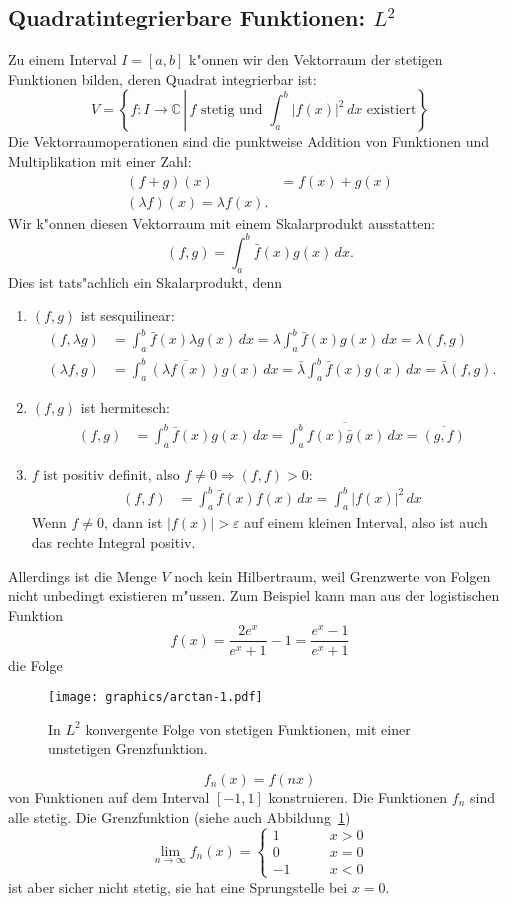 \subsection{Quadratintegrierbare Funktionen: $L^2$}
Zu einem Interval $I=[a,b]$ k"onnen wir den Vektorraum der stetigen Funktionen
bilden, deren Quadrat integrierbar ist:
\[
V=\left\{
f:I\to\mathbb C\,\left|\,
\text{$f$ stetig und $\displaystyle \int_a^b|f(x)|^2\,dx$ existiert}
\right. \right\}
\]
Die Vektorraumoperationen sind die punktweise Addition von Funktionen
und Multiplikation mit einer Zahl:
\begin{align*}
(f+g)(x)&=f(x)+g(x)\\
(\lambda f)(x)=\lambda f(x).
\end{align*}
Wir k"onnen diesen Vektorraum mit einem Skalarprodukt ausstatten:
\[
(f,g)=\int_a^b \bar f(x)g(x)\,dx.
\]
Dies ist tats"achlich ein Skalarprodukt, denn
\begin{enumerate}
\item $(f,g)$ ist sesquilinear:
\begin{align*}
(f,\lambda g)&=\int_a^b\bar f(x)\lambda g(x)\,dx
=\lambda\int_a^b\bar f(x)g(x)\,dx = \lambda(f,g)
\\
(\lambda f,g)&=\int_a^b\overline{(\lambda f(x))}g(x)\,dx
=
\bar\lambda\int_a^b\bar f(x)g(x)\,dx=\bar\lambda (f,g).
\end{align*}
\item $(f,g)$ ist hermitesch:
\begin{align*}
(f,g)&=\int_a^b\bar f(x)g(x)\,dx = \overline{
\int_a^b f(x)\bar g(x)\,dx
}
=
\overline{(g,f)}
\end{align*}
\item $f$ ist positiv definit, also $f\ne 0\Rightarrow (f,f) >0$:
\begin{align*}
(f,f)&=\int_a^b \bar f(x)f(x)\,dx=\int_a^b|f(x)|^2\,dx
\end{align*}
Wenn $f\ne 0$, dann ist $|f(x)|>\varepsilon$ auf einem kleinen Interval,
also ist auch das rechte Integral positiv.
\end{enumerate}
Allerdings ist die Menge $V$ noch kein Hilbertraum, weil Grenzwerte von
Folgen nicht unbedingt existieren m"ussen. Zum Beispiel kann man aus
der logistischen Funktion
\[
f(x)=\frac{2e^x}{e^x+1}-1=\frac{e^x-1}{e^x+1}
\]
die Folge
\begin{figure}
\centering
\texttt{[image: graphics/arctan-1.pdf]}
\caption{In $L^2$ konvergente Folge von stetigen Funktionen, mit einer
unstetigen Grenzfunktion.
\label{skript:logisticfunction}}
\end{figure}
\[
f_n(x)=f(nx)
\]
von Funktionen auf dem Interval $[-1,1]$ konstruieren. Die Funktionen
$f_n$ sind alle stetig.
Die Grenzfunktion (siehe auch Abbildung~\ref{skript:logisticfunction})
\[
\lim_{n\to \infty}f_n(x)=\begin{cases}
1&\qquad x > 0\\
0&\qquad x = 0\\
-1&\qquad x < 0
\end{cases}
\]
ist aber sicher nicht stetig, sie hat eine Sprungstelle bei $x=0$.

